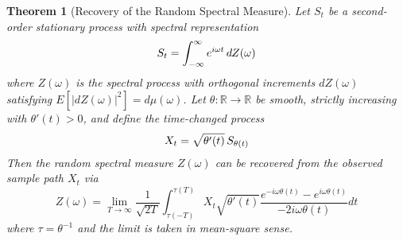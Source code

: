 \documentclass{article}
\newtheorem{theorem}{Theorem}
\begin{document}
\begin{theorem}
  [Recovery of the Random Spectral Measure] Let $S_t$ be a second-order
  stationary process with spectral representation
  \begin{equation}
    S_t = \int_{- \infty}^{\infty} e^{i \omega t}  \hspace{0.17em} dZ (\omega)
  \end{equation}
  where $Z (\omega)$ is the spectral process with orthogonal increments $dZ
  (\omega)$ satisfying $E [|dZ (\omega) |^2] = d \mu (\omega)$. Let $\theta :
  \mathbb{R} \to \mathbb{R}$ be smooth, strictly increasing with $\theta' (t)
  > 0$, and define the time-changed process
  \begin{equation}
    X_t = \sqrt{\theta' (t)}  \hspace{0.17em} S_{\theta (t)}
  \end{equation}
  Then the random spectral measure $Z (\omega)$ can be recovered from the
  observed sample path $X_t$ via
  \begin{equation}
    Z (\omega) = \lim_{T \to \infty}  \frac{1}{\sqrt{2 T}}  \int_{\tau (-
    T)}^{\tau (T)} X_t  \sqrt{\theta' (t)}  \frac{e^{- i \omega \theta (t)} -
    e^{i \omega \theta (t)}}{- 2 i \omega \theta (t)} dt
  \end{equation}
  where $\tau = \theta^{- 1}$ and the limit is taken in mean-square sense.
\end{theorem}
\end{document}
